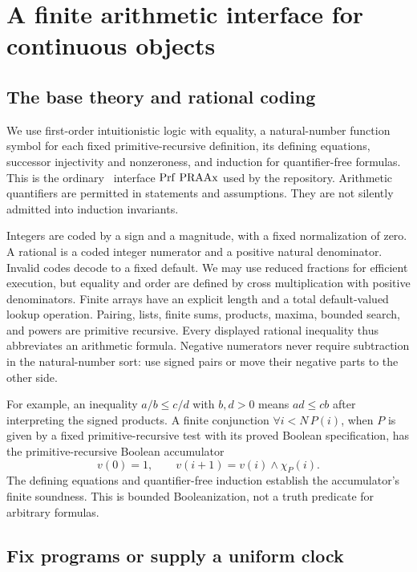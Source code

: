 \section{A finite arithmetic interface for continuous objects}
\label{sec:core}

\subsection{The base theory and rational coding}

We use first-order intuitionistic logic with equality, a natural-number
function symbol for each fixed primitive-recursive definition, its
defining equations, successor injectivity and nonzeroness, and induction
for quantifier-free formulas. This is the ordinary \ipra\ interface
\(\operatorname{Prf}\,\mathrm{PRAAx}\) used by the repository. Arithmetic quantifiers
are permitted in statements and assumptions. They are not silently
admitted into induction invariants.

Integers are coded by a sign and a magnitude, with a fixed normalization
of zero. A rational is a coded integer numerator and a positive natural
denominator. Invalid codes decode to a fixed default. We may use reduced
fractions for efficient execution, but equality and order are defined by
cross multiplication with positive denominators. Finite arrays have an
explicit length and a total default-valued lookup operation. Pairing,
lists, finite sums, products, maxima, bounded search, and powers are
primitive recursive. Every displayed rational inequality thus abbreviates
an arithmetic formula. Negative numerators never require subtraction in
the natural-number sort: use signed pairs or move their negative parts
to the other side.

For example, an inequality \(a/b\leq c/d\) with \(b,d>0\) means
\(ad\leq cb\) after interpreting the signed products. A finite conjunction
\(\forall i<N\,P(i)\), when \(P\) is given by a fixed
primitive-recursive test with its proved Boolean specification, has the
primitive-recursive Boolean accumulator
\[
 v(0)=1,\qquad v(i+1)=v(i)\mathbin{\wedge}\chi_P(i).
\]
The defining equations and quantifier-free induction establish the
accumulator's finite soundness. This is bounded Booleanization, not a
truth predicate for arbitrary formulas.

\subsection{Fix programs or supply a uniform clock}

